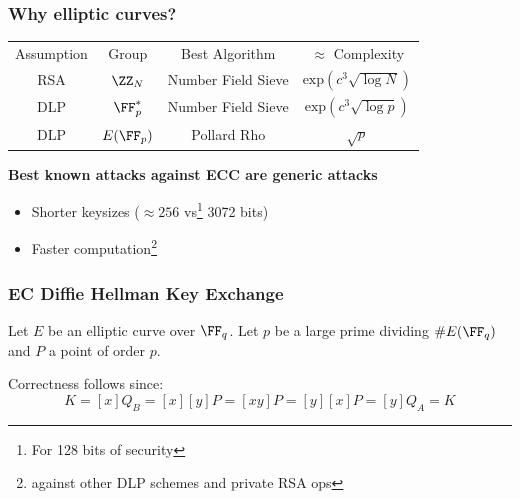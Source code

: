 \documentclass{beamer}
\begin{document}
\begin{frame}
    \frametitle{Why elliptic curves?}
    
    \begin{center}
        \begin{tabular}{c c c c}
            Assumption & Group   & Best Algorithm & $\approx$ Complexity \\
            RSA        & $\ZZ_N$ & Number Field Sieve & $\mathrm{exp}(c ^3\sqrt{\log N})$ \\
            DLP        & $\FF^*_p$ & Number Field Sieve & $\mathrm{exp}(c ^3\sqrt{\log p})$ \\
            DLP        & $E(\FF_p)$ & Pollard Rho & $\sqrt{p}$ \\
        \end{tabular}
    \end{center}
    
    \textbf{Best known attacks against ECC are generic attacks}
    
    \begin{itemize}
        \item Shorter keysizes ($\approx 256$ vs\footnote{For 128 bits of security} 3072 bits)
        \item Faster computation\footnote{against other DLP schemes and private RSA ops}
    \end{itemize}
\end{frame}

\begin{frame}
    \frametitle{EC Diffie Hellman Key Exchange}
    Let $E$ be an elliptic curve over $\FF_q$. Let $p$ be a large prime dividing $\#E(\FF_q)$ and $P$ a point of order $p$. 
    
    
    Correctness follows since:
    \[ K = [x]Q_B = [x][y]P = [xy]P = [y][x]P = [y]Q_A = K \]

\end{frame}
\end{document}
